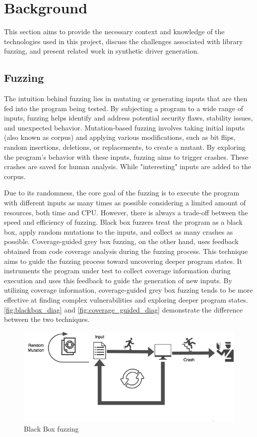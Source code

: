 \documentclass[a4paper,11pt,oneside]{report}
\begin{document}
\chapter{Background}
This section aims to provide the necessary context and knowledge
of the technologies used in this project, discuss the challenges associated with 
library fuzzing, and present related work in synthetic driver generation.


\section{Fuzzing}
The intuition behind fuzzing lies in mutating or generating 
inputs that are then fed into the program being tested. 
By subjecting a program to a wide range of inputs, fuzzing helps 
identify and address potential security flaws, stability issues, and unexpected behavior.
Mutation-based fuzzing involves taking initial inputs (also known as corpus) 
and applying various modifications, such as bit flips, random insertions, deletions, or replacements, 
to create a mutant. By exploring the program's behavior with 
these inputs, fuzzing aims to trigger crashes. These crashes are saved for human analysis.
While "interesting" inputs are added to the corpus.

Due to its randomness, the core goal of the fuzzing is to execute 
the program with different inputs as many times as possible considering 
a limited amount of resources, both time and CPU. However, there is always 
a trade-off between the speed and efficiency of fuzzing. 
Black box fuzzers treat the program as a black box, apply random mutations to the inputs, 
and collect as many crashes as possible. Coverage-guided grey box 
fuzzing, on the other hand, uses feedback obtained from code 
coverage analysis during the fuzzing process. This technique aims 
to guide the fuzzing process toward uncovering deeper program states. 
It instruments the program under test to collect coverage information 
during execution and uses this feedback to guide the generation of new inputs. 
By utilizing coverage information, coverage-guided grey box fuzzing tends 
to be more effective at finding complex vulnerabilities and exploring deeper
program states. \autoref{fig:blackbox_diag} and \autoref{fig:coverage_guided_diag}
demonstrate the difference between the two techniques. 


\begin{figure}[ht]
	\centering
	\includegraphics[width=12cm]{figures/black_box.png}
	\caption{Black Box fuzzing}
	\label{fig:blackbox_diag}
\end{figure}
\end{document}
